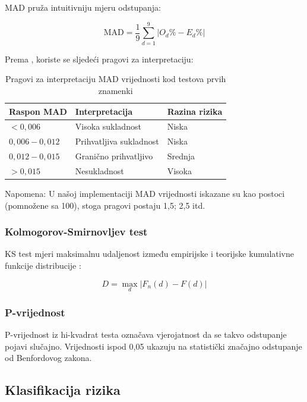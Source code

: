 \documentclass[12pt,a4paper]{article}
\begin{document}
MAD pruža intuitivniju mjeru odstupanja:

\begin{equation}
\text{MAD} = \frac{1}{9} \sum_{d=1}^{9} |O_d\% - E_d\%|
\end{equation}

Prema \citet{nigrini2012}, koriste se sljedeći pragovi za interpretaciju:

\begin{table}[H]
\centering
\caption{Pragovi za interpretaciju MAD vrijednosti kod testova prvih znamenki}
\label{tab:mad_thresholds}
\begin{tabular}{lll}
\toprule
\textbf{Raspon MAD} & \textbf{Interpretacija} & \textbf{Razina rizika} \\
\midrule
$< 0{,}006$ & Visoka sukladnost & \textcolor{lowrisk}{Niska} \\
$0{,}006 - 0{,}012$ & Prihvatljiva sukladnost & \textcolor{lowrisk}{Niska} \\
$0{,}012 - 0{,}015$ & Granično prihvatljivo & \textcolor{mediumrisk}{Srednja} \\
$> 0{,}015$ & Nesukladnost & \textcolor{highrisk}{Visoka} \\
\bottomrule
\end{tabular}
\end{table}

Napomena: U našoj implementaciji MAD vrijednosti iskazane su kao postoci (pomnožene sa 100), stoga pragovi postaju 1,5; 2,5 itd.

\subsubsection{Kolmogorov-Smirnovljev test}

KS test mjeri maksimalnu udaljenost između empirijske i teorijske kumulativne funkcije distribucije \citep{kolmogorov1933}:

\begin{equation}
D = \max_{d} |F_n(d) - F(d)|
\end{equation}

\subsubsection{P-vrijednost}

P-vrijednost iz hi-kvadrat testa označava vjerojatnost da se takvo odstupanje pojavi slučajno. Vrijednosti ispod 0,05 ukazuju na statistički značajno odstupanje od Benfordovog zakona.

\subsection{Klasifikacija rizika}
\end{document}
